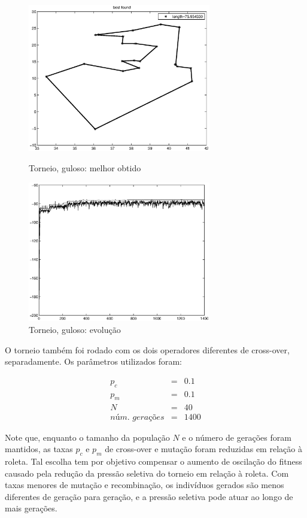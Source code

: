 \documentclass[a4paper]{article}
\begin{document}
\begin{figure}
\begin{minipage}[b]{0.5\linewidth} %
\centering
\includegraphics[width=8cm]{torneio_greedy_best}
\caption{Torneio, guloso: melhor obtido}
\label{fig:torneio_greedy_best}
\end{minipage}
\hspace{0.5cm} %
\begin{minipage}[b]{0.5\linewidth}
\centering
\includegraphics[width=8cm]{torneio_greedy_evol}
\caption{Torneio, guloso: evolução}
\label{fig:torneio_greedy_evol}
\end{minipage}
\end{figure}

O torneio também foi rodado com os dois operadores diferentes de cross-over, separadamente. Os parâmetros utilizados foram:

\begin{eqnarray*}
p_c &=& 0.1\\
p_m &=& 0.1\\
N &=& 40\\
\textit{núm. gerações} &=& 1400
\end{eqnarray*}

Note que, enquanto o tamanho da população $N$ e o número de gerações foram mantidos, as taxas $p_c$ e $p_m$ de cross-over e mutação foram reduzidas em relação à roleta. Tal escolha tem por objetivo compensar o aumento de oscilação do fitness causado pela redução da pressão seletiva do torneio em relação à roleta. Com taxas menores de mutação e recombinação, os indivíduos gerados são menos diferentes de geração para geração, e a pressão seletiva pode atuar ao longo de mais gerações.
\end{document}
